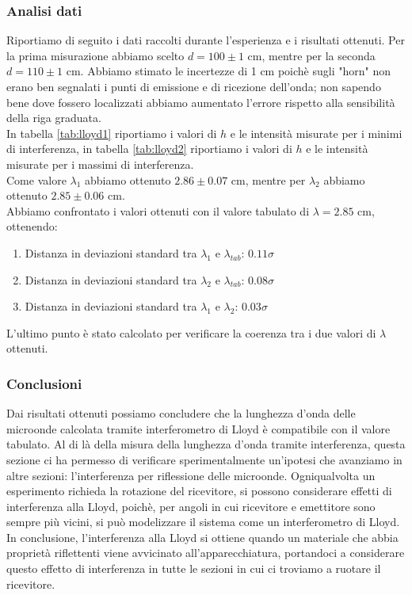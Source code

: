 \documentclass[letterpaper,12pt]{article}
\begin{document}
\subsubsection{Analisi dati}
Riportiamo di seguito i dati raccolti durante l'esperienza e i risultati ottenuti.
Per la prima misurazione abbiamo scelto $d = 100 \pm 1$ cm, mentre per la seconda $d = 110 \pm 1$ cm. Abbiamo stimato
le incertezze di 1 cm poichè sugli "horn" non erano ben segnalati i punti di emissione e di ricezione
dell'onda; non sapendo bene dove fossero localizzati abbiamo aumentato l'errore rispetto alla sensibilità della riga
graduata.\\
In tabella \ref{tab:lloyd1} riportiamo i valori di $h$ e le intensità misurate per i minimi di interferenza,
in tabella \ref{tab:lloyd2} riportiamo i valori di $h$ e le intensità misurate per i massimi di interferenza.\\
Come valore $\lambda_1$ abbiamo ottenuto $2.86 \pm 0.07$ cm, mentre per $\lambda_2$ abbiamo ottenuto $2.85 \pm 0.06$ cm.\\
Abbiamo confrontato i valori ottenuti con il valore tabulato di $\lambda = 2.85$ cm, ottenendo:
\begin{enumerate}
	\item Distanza in deviazioni standard tra $\lambda_1$ e $\lambda_{tab}$: $0.11 \sigma$
	\item Distanza in deviazioni standard tra $\lambda_2$ e $\lambda_{tab}$: $0.08 \sigma$
	\item Distanza in deviazioni standard tra $\lambda_1$ e $\lambda_2$: $0.03 \sigma$
\end{enumerate}
L'ultimo punto è stato calcolato per verificare la coerenza tra i due valori di $\lambda$ ottenuti.\\

\subsubsection{Conclusioni}
Dai risultati ottenuti possiamo concludere che la lunghezza d'onda delle microonde calcolata tramite interferometro
di Lloyd è compatibile con il valore tabulato.
Al di là della misura della lunghezza d'onda tramite interferenza, questa sezione ci ha permesso di verificare
sperimentalmente un'ipotesi che avanziamo in altre sezioni: l'interferenza per riflessione delle microonde. Ogniqualvolta
un esperimento richieda la rotazione del ricevitore, si possono considerare effetti di interferenza alla Lloyd,
poichè, per angoli in cui ricevitore e emettitore sono sempre più vicini, si può modelizzare il sistema come
un interferometro di Lloyd.\\
In conclusione, l'interferenza alla Lloyd si ottiene quando un materiale che abbia proprietà riflettenti viene
avvicinato all'apparecchiatura, portandoci a considerare questo effetto di interferenza in tutte le sezioni in cui
ci troviamo a ruotare il ricevitore.\\
\end{document}
